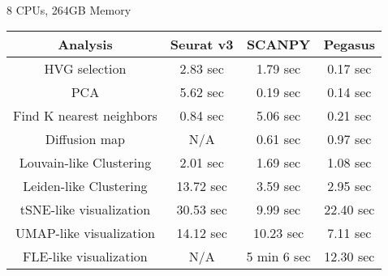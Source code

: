 \documentclass[10pt]{article}
\begin{document}
\paragraph{}
8 CPUs, 264GB Memory

\begin{table}[H]
	\centering
	\begin{tabular}{|c|c|c|c|}
		\hline
		Analysis & Seurat v3 & SCANPY & Pegasus\\
		\hline \hline
		HVG selection & 2.83 sec  & 1.79 sec & 0.17 sec  \\
		\hline
		PCA & 5.62 sec & 0.19 sec & 0.14 sec  \\
		\hline
		Find K nearest neighbors & 0.84 sec & 5.06 sec & 0.21 sec  \\
		\hline
		Diffusion map & N/A & 0.61 sec & 0.97 sec  \\
		\hline
		Louvain-like Clustering & 2.01 sec & 1.69 sec & 1.08 sec \\
		\hline 
		Leiden-like Clustering & 13.72 sec & 3.59 sec & 2.95 sec \\
		\hline
		tSNE-like visualization & 30.53 sec & 9.99 sec & 22.40 sec  \\
		\hline
		UMAP-like visualization & 14.12 sec & 10.23 sec & 7.11 sec \\
		\hline
		FLE-like visualization & N/A & 5 min 6 sec & 12.30 sec \\
		\hline
	\end{tabular}
\end{table}
\end{document}
